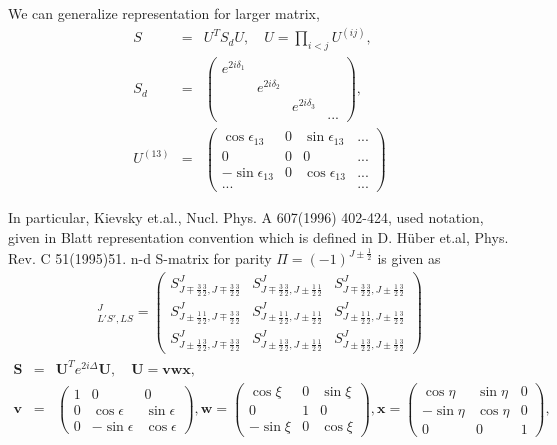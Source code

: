\documentclass[10pt]{article}
\def\bm{\boldsymbol}
\newcommand{\bea}{\begin{eqnarray}}
\newcommand{\eea}{\end{eqnarray}}
\newcommand{\no}{\nonumber \\}
\begin{document}
We can generalize representation for larger matrix,
\bea
S&=&U^T S_d U,\quad U= \prod_{i<j} U^{(ij)}, \no
S_d&=& \left(\begin{array}{cccc} e^{2i\delta_1} &  &  &  \\
                                     &e^{2i\delta_2} & &\\
                                     &  & e^{2i\delta_3} & \\
                                     &  &  & ...   
\end{array}
\right),\no
U^{(13)}&=& \left(\begin{array}{cccc} 
   \cos\epsilon_{13} & 0 &\sin\epsilon_{13} & ... \\
   0                 & 0  &  0   & ...\\
   -\sin\epsilon_{13} & 0 & \cos\epsilon_{13} &... \\
   ... &   &   &     ...
\end{array}
\right)
\eea

In particular, 
Kievsky et.al., Nucl. Phys. A 607(1996) 402-424,
 used notation,
 given in  Blatt representation convention which is defined in 
    D. H\"uber et.al, Phys. Rev. C 51(1995)51.
      n-d S-matrix for parity $\Pi=(-1)^{J\pm\frac{1}{2}}$
      is given as
\bea
[S]_{L'S',LS}^J=\left(\begin{array}{ccc}
    S^J_{J\mp\frac{3}{2} \frac{3}{2},J\mp\frac{3}{2}\frac{3}{2}}&
    S^J_{J\mp\frac{3}{2} \frac{3}{2},J\pm\frac{1}{2}\frac{1}{2}}&
    S^J_{J\mp\frac{3}{2} \frac{3}{2},J\pm\frac{1}{2}\frac{3}{2}}\\
    S^J_{J\pm\frac{1}{2} \frac{1}{2},J\mp\frac{3}{2}\frac{3}{2}}&
    S^J_{J\pm\frac{1}{2} \frac{1}{2},J\pm\frac{1}{2}\frac{1}{2}}&
    S^J_{J\pm\frac{1}{2} \frac{1}{2},J\pm\frac{1}{2}\frac{3}{2}}\\
    S^J_{J\pm\frac{1}{2} \frac{3}{2},J\mp\frac{3}{2}\frac{3}{2}}&
    S^J_{J\pm\frac{1}{2} \frac{3}{2},J\pm\frac{1}{2}\frac{1}{2}}&
    S^J_{J\pm\frac{1}{2} \frac{3}{2},J\pm\frac{1}{2}\frac{3}{2}} 
\end{array}\right)
\eea
\bea
{\bm S}&=&{\bm U}^T e^{2i\Delta} {\bm U},\quad
{\bm U}={\bm{v w x}},\no
{\bm v}&=&\left(\begin{array}{ccc}
            1 & 0 & 0 \\ 0 &\cos\epsilon&\sin\epsilon \\
            0 & -\sin\epsilon & \cos\epsilon   
\end{array}\right),
{\bm w}=\left(\begin{array}{ccc}
            \cos\xi & 0 & \sin\xi \\ 0 &1 &0  \\
            -\sin\xi & 0 & \cos\xi   
\end{array}\right),
{\bm x}=\left(\begin{array}{ccc}
            \cos\eta & \sin\eta & 0 \\ 
            -\sin\eta &\cos\eta&0 \\
            0 & 0 & 1   
\end{array}\right),
\eea
\end{document}
